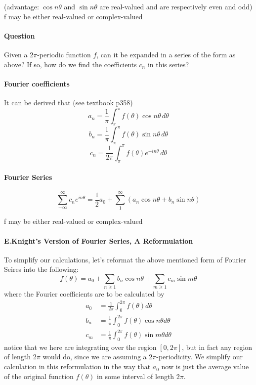 \documentclass[11pt]{article}
\begin{document}
(advantage: $\cos n\theta$ and $\sin n\theta$ are real-valued and are respectively even and odd)\\
f may be either real-valued or complex-valued\\
\paragraph{Question}
Given a $2\pi$-periodic function $f$, can it be expanded in a series of the form as above? If so, how do we find the coefficients $c_n$ in this series?
\paragraph{Fourier coefficients}
It can be derived that (see textbook p358)
$$a_n = \frac{1}{\pi}\int_\pi^\pi f(\theta)\cos n\theta \, d\theta$$
$$b_n = \frac{1}{\pi}\int_\pi^\pi f(\theta)\sin n\theta \, d\theta$$
$$c_n = \frac{1}{2\pi}\int_\pi^\pi f(\theta)e^{-in\theta} \, d\theta$$
\paragraph{Fourier Series}
$$\sum_{-\infty}^{\infty} c_n e^{in\theta} = \frac{1}{2}a_0 + \sum_1^\infty(a_n\cos n\theta + b_n \sin n\theta)$$

f may be either real-valued or complex-valued

\paragraph{E.Knight's Version of Fourier Series, A Reformulation} To simplify our 
calculations, let's reformat the above mentioned form
of Fourier Seires into the following:
\begin{equation*}
    f(\theta) = a_0 + \sum_{n\geq 1}b_n\cos n\theta + \sum_{m \geq 1}c_m\sin m \theta
\end{equation*}
where the Fourier coefficients are to be calculated by
\begin{align*}
    a_0 &= \frac{1}{2\pi}\int_{0}^{2\pi}f(\theta)d\theta \\
    b_n &= \frac{1}{\pi}\int_{0}^{2\pi}f(\theta)\cos n\theta d\theta \\
    c_m &= \frac{1}{\pi}\int_{0}^{2\pi}f(\theta)\sin m\theta d\theta 
\end{align*}
notice that we here are integrating over the region $[0, 2\pi]$, but in fact
any region of length $2\pi$ would do, since we are assuming a $2\pi$-periodicity.
We simplify our calculation in this reformulation in the way that $a_0$ now is
just the average value of the original function $f(\theta)$ in some interval
of length $2\pi$.
\end{document}
